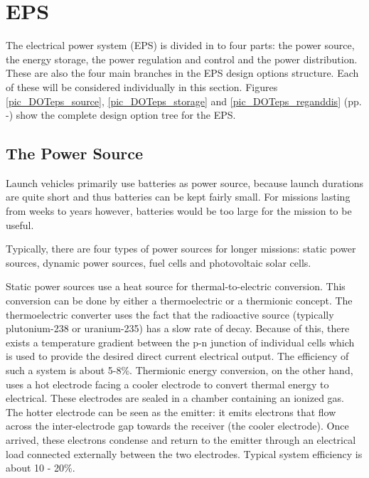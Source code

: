 \section{\acl{EPS}}
\label{designOptionsPower}

The electrical power system (EPS) is divided in to four parts: the power source, the energy storage, the power regulation and control and the power distribution. These are also the four main branches in the EPS design options structure. Each of these will be considered individually in this section. Figures \ref{pic_DOTeps_source}, \ref{pic_DOTeps_storage} and \ref{pic_DOTeps_reganddis} (pp. \pageref{pic_DOTeps_source}-\pageref{pic_DOTeps_reganddis}) show the complete design option tree for the EPS.

\subsection{The Power Source}
\label{blDOsource}

Launch vehicles primarily use batteries as power source, because launch durations are quite short and thus batteries can be kept fairly small. For missions lasting from weeks to years however, batteries would be too large for the mission to be useful.

Typically, there are four types of power sources for longer missions: static power sources, dynamic power sources, fuel cells and photovoltaic solar cells.

Static power sources use a heat source for thermal-to-electric conversion. This conversion can be done by either a thermoelectric or a thermionic
concept. The thermoelectric converter uses the fact that the radioactive source (typically plutonium-238 or uranium-235) has a slow rate of decay.
Because of this, there exists a temperature gradient between the p-n junction of individual cells which is used to provide the desired direct current electrical output. The efficiency of such a system is about 5-8\%.
Thermionic energy conversion, on the other hand, uses a hot electrode facing a cooler electrode to convert thermal energy to electrical.
These electrodes are sealed in a chamber containing an ionized gas. The hotter electrode can be seen as the emitter: it emits electrons that flow
across the inter-electrode gap towards the receiver (the cooler electrode). Once arrived, these electrons condense and return to the emitter through an electrical load connected externally between the two electrodes. Typical system efficiency is about 10 - 20\%.

